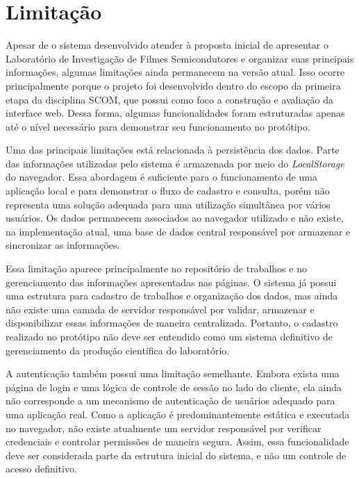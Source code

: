 \vspace{5mm}
\section{Limitação}

Apesar de o sistema desenvolvido atender à proposta inicial de apresentar o Laboratório de Investigação de Filmes Semicondutores e organizar suas principais informações, algumas limitações ainda permanecem na versão atual. Isso ocorre principalmente porque o projeto foi desenvolvido dentro do escopo da primeira etapa da disciplina SCOM, que possui como foco a construção e avaliação da interface web. Dessa forma, algumas funcionalidades foram estruturadas apenas até o nível necessário para demonstrar seu funcionamento no protótipo.

Uma das principais limitações está relacionada à persistência dos dados. Parte das informações utilizadas pelo sistema é armazenada por meio do \textit{LocalStorage} do navegador. Essa abordagem é suficiente para o funcionamento de uma aplicação local e para demonstrar o fluxo de cadastro e consulta, porém não representa uma solução adequada para uma utilização simultânea por vários usuários. Os dados permanecem associados ao navegador utilizado e não existe, na implementação atual, uma base de dados central responsável por armazenar e sincronizar as informações.

Essa limitação aparece principalmente no repositório de trabalhos e no gerenciamento das informações apresentadas nas páginas. O sistema já possui uma estrutura para cadastro de trabalhos e organização dos dados, mas ainda não existe uma camada de servidor responsável por validar, armazenar e disponibilizar essas informações de maneira centralizada. Portanto, o cadastro realizado no protótipo não deve ser entendido como um sistema definitivo de gerenciamento da produção científica do laboratório.

A autenticação também possui uma limitação semelhante. Embora exista uma página de login e uma lógica de controle de sessão no lado do cliente, ela ainda não corresponde a um mecanismo de autenticação de usuários adequado para uma aplicação real. Como a aplicação é predominantemente estática e executada no navegador, não existe atualmente um servidor responsável por verificar credenciais e controlar permissões de maneira segura. Assim, essa funcionalidade deve ser considerada parte da estrutura inicial do sistema, e não um controle de acesso definitivo.

